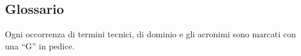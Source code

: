 	\subsection{Glossario}
	Ogni occorrenza di termini tecnici, di dominio e gli acronimi sono marcati con una ``G'' in pedice.



